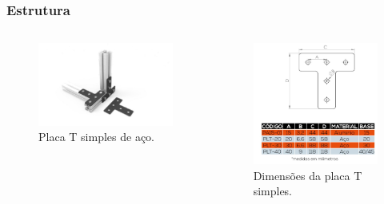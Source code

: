     \begin{frame}
    \frametitle{Estrutura}
    
    \begin{columns}
        \begin{figure}
            \centering
            \includegraphics[scale = 0.14]{figuras/placatp}
            \caption{Placa T simples de aço.}
        \end{figure}            
        \begin{figure}
            \centering
            \includegraphics[scale = 0.12]{figuras/placatd}
            \caption{Dimensões da placa T simples.}
        \end{figure}            
    \end{columns}        
\end{frame}
    
